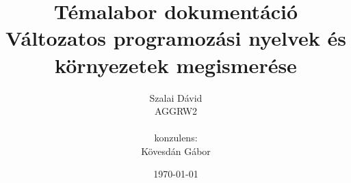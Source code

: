 



	
	\title{Témalabor dokumentáció \\ Változatos programozási nyelvek és környezetek megismerése }
	\author{Szalai Dávid \\ AGGRW2 \\ \\ konzulens: \\ Kövesdán Gábor}
	\date{\today}
	
	\maketitle
	
	\tableofcontents
	
	\clearpage
	
	
	
	
	
